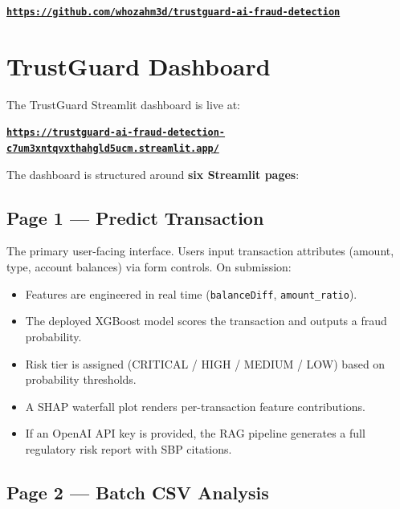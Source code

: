 \documentclass[12pt,a4paper]{article}
\begin{document}
\begin{center}
\small\bfseries\color{TGBlue}
\href{https://github.com/whozahm3d/trustguard-ai-fraud-detection}{\texttt{https://github.com/whozahm3d/trustguard-ai-fraud-detection}}
\end{center}

\section{TrustGuard Dashboard}

\label{sec:dashboard}

The TrustGuard Streamlit dashboard is live at:

\begin{center}
\small\bfseries\color{TGBlue}
\href{https://trustguard-ai-fraud-detection-c7um3xntqvxthahgld5ucm.streamlit.app/}{\texttt{https://trustguard-ai-fraud-detection-c7um3xntqvxthahgld5ucm.streamlit.app/}}
\end{center}

The dashboard is structured around \textbf{six Streamlit pages}:

\subsection{Page 1 --- Predict Transaction}

The primary user-facing interface. Users input transaction attributes (amount, type, account balances) via form controls. On submission:
\begin{itemize}[noitemsep]
  \item Features are engineered in real time (\texttt{balanceDiff}, \texttt{amount\_ratio}).
  \item The deployed XGBoost model scores the transaction and outputs a fraud probability.
  \item Risk tier is assigned (CRITICAL / HIGH / MEDIUM / LOW) based on probability thresholds.
  \item A SHAP waterfall plot renders per-transaction feature contributions.
  \item If an OpenAI API key is provided, the RAG pipeline generates a full regulatory risk report with SBP citations.
\end{itemize}

\subsection{Page 2 --- Batch CSV Analysis}
\end{document}
